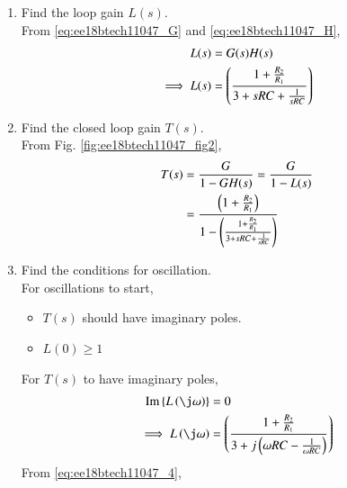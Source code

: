 \begin{enumerate}[label=\arabic*.,ref=\theenumi]
%
\item Find the loop gain $L(s)$.\\
\solution 
From \eqref{eq:ee18btech11047_G}
and \eqref{eq:ee18btech11047_H},
\begin{align}
L(s) &= G(s)H(s)
\\
\implies L(s) &= \brak{\frac{1+\frac{R_{2}}{R_{1}}}{3+sRC+\frac{1}{sRC}}}
\label{eq:ee18btech11047_4}
\end{align}
%
\item Find the closed loop gain $T(s)$.
\\
\solution From Fig. \ref{fig:ee18btech11047_fig2},
%
\begin{align}
T(s) &= \frac{G}{1-GH(s)}=\frac{G}{1-L(s)}
\\
&= \frac{\brak{1+\frac{R_2}{R_1}}}{1-\brak{\frac{1+\frac{R_{2}}{R_{1}}}{3+sRC+\frac{1}{sRC}}}} \label{eq:ee18btech11047_Ts}
\end{align}
\item Find the conditions for oscillation.\\
\solution For oscillations to start, 
\begin{itemize}
    \item $T(s)$ should have imaginary poles.
    \item $L(0) \ge 1$
\end{itemize}
%
For $T(s)$ to have imaginary poles, 
\begin{align}
\text{Im}\cbrak{L\brak{\j \omega}} &= 0
\\
\implies L\brak{\j\omega}&= \brak{\frac{1+\frac{R_{2}}{R_{1}}}{3+ j \brak{\omega RC-\frac{1}{\omega RC}}}}
\end{align}
From \eqref{eq:ee18btech11047_4},


\end{enumerate}
